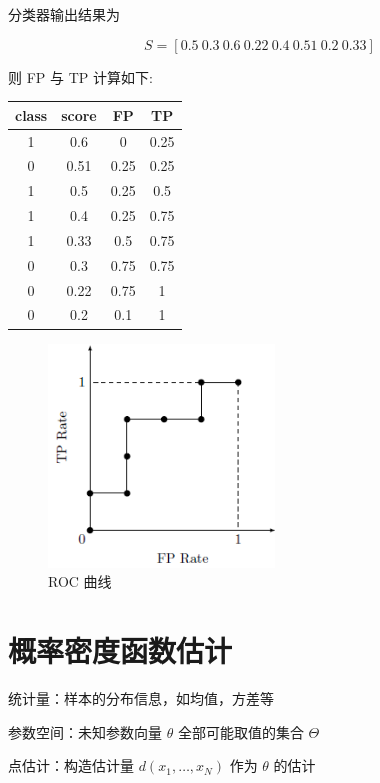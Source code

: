 \documentclass[openany,a4paper,12pt]{ctexbook}
\theoremstyle{kaiti}
\theoremstyle{normal}
\begin{document}
分类器输出结果为

\begin{equation}
S = [0.5~0.3~0.6~0.22~0.4~0.51~0.2~0.33]
\end{equation}

则 FP 与 TP 计算如下:

\begin{table}
  \centering
  \begin{tabular}{cccc}
    \hline
    class & score & FP   & TP   \\
    \hline
    1     & 0.6   & 0    & 0.25 \\
    0     & 0.51  & 0.25 & 0.25 \\
    1     & 0.5   & 0.25 & 0.5  \\
    1     & 0.4   & 0.25 & 0.75 \\
    1     & 0.33  & 0.5  & 0.75 \\
    0     & 0.3   & 0.75 & 0.75 \\
    0     & 0.22  & 0.75 & 1    \\
    0     & 0.2   & 0.1  & 1   \\
    \hline
  \end{tabular}
\end{table}

\begin{figure}
  \centering
  \includegraphics[width=6cm]{1627808143710-1.7.png}
  \caption{ROC 曲线}
\end{figure}

\chapter{概率密度函数估计}

统计量：样本的分布信息，如均值，方差等

参数空间：未知参数向量 $\theta$ 全部可能取值的集合 $\Theta$

点估计：构造估计量 $d\left(x_1,\dots ,x_N \right)$ 作为 $\theta$ 的估计
\end{document}
